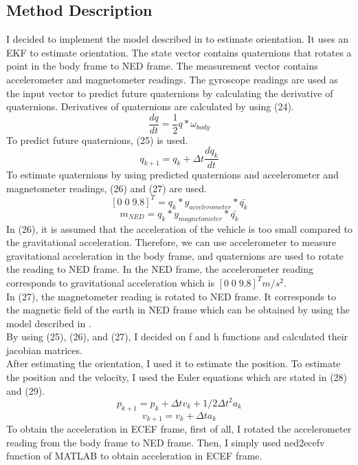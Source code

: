 \documentclass[12pt]{article}
\begin{document}
    \subsection{Method Description}
    I decided to implement the model described in \cite{kok} to estimate orientation. 
    It uses an EKF to estimate orientation. The state vector contains 
    quaternions that rotates a point in the body frame to NED frame. The 
    measurement vector contains accelerometer and magnetometer readings. 
    The gyroscope readings are used as the input vector to predict future 
    quaternions by calculating the derivative of quaternions. Derivatives of 
    quaternions are calculated by using (24).
    \begin{equation}\label{eq:24}
        \frac{dq}{dt} = \frac{1}{2}q*\omega_{body}
    \end{equation}
    To predict future quaternions, (25) is used.
    \begin{equation}\label{eq:25}
        q_{k+1} = q_{k} + \Delta t\frac{dq_k}{dt}
    \end{equation}
    To estimate quaternions by using predicted quaternions and accelerometer 
    and magnetometer readings, (26) and (27) are used.
    \begin{equation}\label{eq:26}
        [0\; 0\; 9.8]^T = q_k*y_{accelerometer}*\bar{q_k}
    \end{equation}
    \begin{equation}\label{eq:27}
        m_{NED} = q_k*y_{magnetometer}*\bar{q_k}
    \end{equation}
    In (26), it is assumed that the acceleration of the vehicle is 
    too small compared to the gravitational acceleration. Therefore, 
    we can use accelerometer to measure gravitational acceleration in the body frame, 
    and quaternions are used to rotate the reading to NED frame. 
    In the NED frame, the accelerometer reading corresponds to gravitational 
    acceleration which is \([0\; 0\; 9.8]^T m/s^2\). \\
    In (27), the magnetometer reading is rotated to NED frame. 
    It corresponds to the magnetic field of the earth in NED frame which 
    can be obtained by using the model described in \cite{vmm}. \\
    By using (25), (26), and (27), I decided on f and h functions and 
    calculated their jacobian matrices.\\
    After estimating the orientation, I used it to estimate the position. 
    To estimate the position and the velocity, I used the Euler equations 
    which are stated in (28) and (29).
    \begin{equation}\label{eq:28}
        p_{k+1} = p_k + \Delta tv_k + 1/2\Delta t^2a_k
    \end{equation}
    \begin{equation}\label{eq:29}
        v_{k+1} = v_k + \Delta ta_k
    \end{equation}
    To obtain the acceleration in ECEF frame, first of all, I rotated 
    the accelerometer reading from the body frame to NED frame. Then, 
    I simply used ned2ecefv function of MATLAB to obtain acceleration 
    in ECEF frame.
\end{document}
